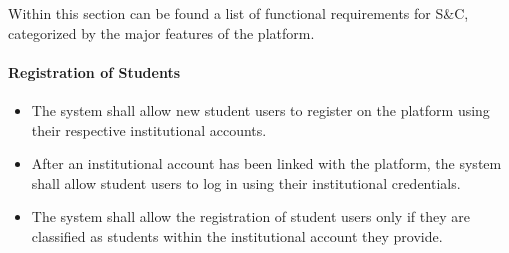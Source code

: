 


Within this section can be found a list of functional requirements for S\&C, categorized by the major features of the platform.

\paragraph{Registration of Students}
\begin{itemize}[label={[\textbf{FR}]}, align=left, leftmargin=*]
    \item {} The system shall allow new student users to register on the platform using their respective institutional accounts.
    \item {} After an institutional account has been linked with the platform, the system shall allow student users to log in using their institutional credentials.
    \item {} The system shall allow the registration of student users only if they are classified as students within the institutional account they provide.
\end{itemize}

